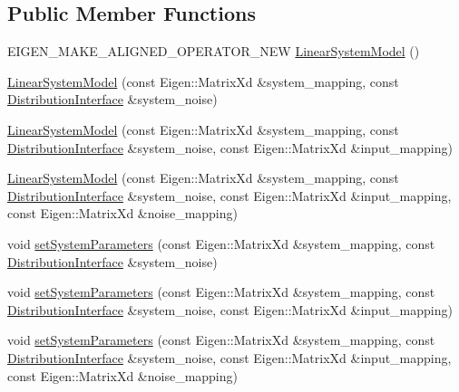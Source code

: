 \subsection*{Public Member Functions}
\begin{DoxyCompactItemize}
\item 
E\+I\+G\+E\+N\+\_\+\+M\+A\+K\+E\+\_\+\+A\+L\+I\+G\+N\+E\+D\+\_\+\+O\+P\+E\+R\+A\+T\+O\+R\+\_\+\+N\+EW \hyperlink{classrefill_1_1LinearSystemModel_a3e65d1c380d1c9abf807ca3a4814043e}{Linear\+System\+Model} ()
\item 
\hyperlink{classrefill_1_1LinearSystemModel_ab153e34ae8b09eedf442841f744851e6}{Linear\+System\+Model} (const Eigen\+::\+Matrix\+Xd \&system\+\_\+mapping, const \hyperlink{classrefill_1_1DistributionInterface}{Distribution\+Interface} \&system\+\_\+noise)
\item 
\hyperlink{classrefill_1_1LinearSystemModel_a48ede1019cfda95201e84371562d376b}{Linear\+System\+Model} (const Eigen\+::\+Matrix\+Xd \&system\+\_\+mapping, const \hyperlink{classrefill_1_1DistributionInterface}{Distribution\+Interface} \&system\+\_\+noise, const Eigen\+::\+Matrix\+Xd \&input\+\_\+mapping)
\item 
\hyperlink{classrefill_1_1LinearSystemModel_a35cfa05a9104d41f924acd5a9b183deb}{Linear\+System\+Model} (const Eigen\+::\+Matrix\+Xd \&system\+\_\+mapping, const \hyperlink{classrefill_1_1DistributionInterface}{Distribution\+Interface} \&system\+\_\+noise, const Eigen\+::\+Matrix\+Xd \&input\+\_\+mapping, const Eigen\+::\+Matrix\+Xd \&noise\+\_\+mapping)
\item 
void \hyperlink{classrefill_1_1LinearSystemModel_aa1644a0a0d363634205eaa7d1e1bfea8}{set\+System\+Parameters} (const Eigen\+::\+Matrix\+Xd \&system\+\_\+mapping, const \hyperlink{classrefill_1_1DistributionInterface}{Distribution\+Interface} \&system\+\_\+noise)
\item 
void \hyperlink{classrefill_1_1LinearSystemModel_a1bfe228bb42920399034c39ff59ae09d}{set\+System\+Parameters} (const Eigen\+::\+Matrix\+Xd \&system\+\_\+mapping, const \hyperlink{classrefill_1_1DistributionInterface}{Distribution\+Interface} \&system\+\_\+noise, const Eigen\+::\+Matrix\+Xd \&input\+\_\+mapping)
\item 
void \hyperlink{classrefill_1_1LinearSystemModel_aae2e0643e8091ccb36c14496a4e86334}{set\+System\+Parameters} (const Eigen\+::\+Matrix\+Xd \&system\+\_\+mapping, const \hyperlink{classrefill_1_1DistributionInterface}{Distribution\+Interface} \&system\+\_\+noise, const Eigen\+::\+Matrix\+Xd \&input\+\_\+mapping, const Eigen\+::\+Matrix\+Xd \&noise\+\_\+mapping)

\end{DoxyCompactItemize}
